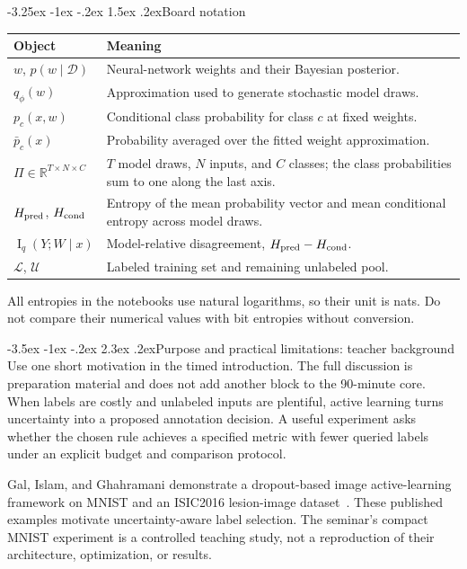 \documentclass[11pt,a4paper]{article}
\makeatletter
\newcommand{\R}{\mathbb R}
\newcommand{\MI}{\operatorname{I}}
\renewcommand\section{\@startsection{section}{1}{\z@}%
  {-3.5ex \@plus -1ex \@minus -.2ex}%
  {2.3ex \@plus .2ex}{\normalfont\Large}}
\renewcommand\subsection{\@startsection{subsection}{2}{\z@}%
  {-3.25ex \@plus -1ex \@minus -.2ex}%
  {1.5ex \@plus .2ex}{\normalfont\large}}
\makeatother
\begin{document}
\subsection{Board notation}
\begin{center}
\begin{tabular}{@{}p{36mm}p{121mm}@{}}
\toprule
Object & Meaning \\
\midrule
$w$, $p(w\mid\mathcal D)$ & Neural-network weights and their Bayesian posterior. \\
$q_\phi(w)$ & Approximation used to generate stochastic model draws. \\
$p_c(x,w)$ & Conditional class probability for class $c$ at fixed weights. \\
$\bar p_c(x)$ & Probability averaged over the fitted weight approximation. \\
$\Pi\in\R^{T\times N\times C}$ & $T$ model draws, $N$ inputs, and $C$ classes;
the class probabilities sum to one along the last axis. \\
$H_{\rm pred}$, $H_{\rm cond}$ & Entropy of the mean probability vector and mean
conditional entropy across model draws. \\
$\MI_q(Y;W\mid x)$ & Model-relative disagreement, $H_{\rm pred}-H_{\rm cond}$. \\
$\mathcal L$, $\mathcal U$ & Labeled training set and remaining unlabeled pool. \\
\bottomrule
\end{tabular}
\end{center}
All entropies in the notebooks use natural logarithms, so their unit is nats.
Do not compare their numerical values with bit entropies without conversion.

\section{Purpose and practical limitations: teacher background}
Use one short motivation in the timed introduction. The full discussion is
preparation material and does not add another block to the 90-minute core.
When labels are costly and unlabeled inputs are plentiful, active learning
turns uncertainty into a proposed annotation decision. A useful experiment
asks whether the chosen rule achieves a specified metric with fewer queried
labels under an explicit budget and comparison protocol.

Gal, Islam, and Ghahramani demonstrate a dropout-based image active-learning
framework on MNIST and an ISIC2016 lesion-image dataset~\cite{gal2017}.
These published examples motivate uncertainty-aware label selection. The
seminar's compact MNIST experiment is a controlled teaching study, not a
reproduction of their architecture, optimization, or results.
\end{document}
